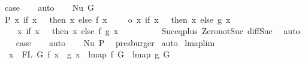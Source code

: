\begin{isabellebody}
\ {\isacharquery}{\kern0pt}case\isanewline
\ \ \isamarkupfalse%
\ auto\isanewline
{}\isamarkupfalse%
\isanewline
\ \ \isamarkupfalse%
\ {\isacharparenleft}{\kern0pt}Nu\ G{\isacharparenright}{\kern0pt}\isanewline
\ \ \isamarkupfalse%
\ P{}{\isacharcolon}{\kern0pt}\ {\isachardoublequoteopen}{\isacharparenleft}{\kern0pt}{\isasymlambda}x{\isachardot}{\kern0pt}\ if\ x\ {\isacharequal}{\kern0pt}\ {}\ then\ x\ else\ f\ {\isacharparenleft}{\kern0pt}x\ {\isacharminus}{\kern0pt}\ {}{\isacharparenright}{\kern0pt}\ {\isacharplus}{\kern0pt}\ {}{\isacharparenright}{\kern0pt}\ o\ {\isacharparenleft}{\kern0pt}{\isasymlambda}x{\isachardot}{\kern0pt}\ if\ x\ {\isacharequal}{\kern0pt}\ {}\ then\ x\ else\ g\ {\isacharparenleft}{\kern0pt}x\ {\isacharminus}{\kern0pt}\ {}{\isacharparenright}{\kern0pt}\ {\isacharplus}{\kern0pt}\ {}{\isacharparenright}{\kern0pt}\ {\isacharequal}{\kern0pt}\isanewline
\ \ \ \ {\isacharparenleft}{\kern0pt}{\isasymlambda}x{\isachardot}{\kern0pt}\ if\ x\ {\isacharequal}{\kern0pt}\ {}\ then\ x\ else\ f\ {\isacharparenleft}{\kern0pt}g\ {\isacharparenleft}{\kern0pt}x\ {\isacharminus}{\kern0pt}\ {}{\isacharparenright}{\kern0pt}{\isacharparenright}{\kern0pt}\ {\isacharplus}{\kern0pt}\ {}{\isacharparenright}{\kern0pt}{\isachardoublequoteclose}\isanewline
\ \ \ \ \isamarkupfalse%
\ Suc{\isacharunderscore}{\kern0pt}eq{\isacharunderscore}{\kern0pt}plus{}\ Zero{\isacharunderscore}{\kern0pt}not{\isacharunderscore}{\kern0pt}Suc\ diff{\isacharunderscore}{\kern0pt}Suc{\isacharunderscore}{\kern0pt}{}\ \isamarkupfalse%
\ auto\isanewline
\ \ \isamarkupfalse%
\ {\isacharquery}{\kern0pt}case\isanewline
\ \ \isamarkupfalse%
\ auto\isanewline
\ \ \isamarkupfalse%
\ Nu\ P{}\ \isamarkupfalse%
\ presburger\isanewline
{}\isamarkupfalse%
\ auto%
\endisatagproof
{\isafoldproof}%
%
\isadelimproof
\isanewline
%
\endisadelimproof
\isanewline
\isanewline
{}\isamarkupfalse%
\ lmap{\isacharunderscore}{\kern0pt}lim{\isacharcolon}{\kern0pt}\isanewline
\ \ {\isachardoublequoteopen}{\isacharparenleft}{\kern0pt}{\isasymforall}x\ {\isasymin}\ FL\ G{\isachardot}{\kern0pt}\ f\ x\ {\isacharequal}{\kern0pt}\ g\ x{\isacharparenright}{\kern0pt}\ {\isacharequal}{\kern0pt}{\isacharequal}{\kern0pt}{\isachargreater}{\kern0pt}\ lmap\ f\ G\ {\isacharequal}{\kern0pt}\ lmap\ g\ G{\isachardoublequoteclose}\isanewline

\end{isabellebody}
